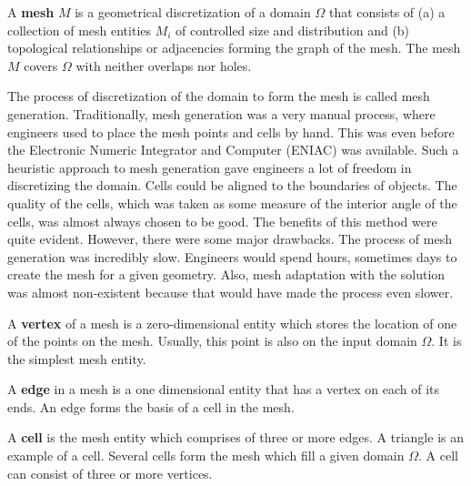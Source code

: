 \begin{definition}
	A \textbf{mesh} $M$ is a geometrical discretization of a domain $\Omega$ that consists of (a) a collection of mesh entities $M_i$ of controlled size and distribution and (b) topological relationships or adjacencies forming the graph of the mesh. The mesh $M$ covers $\Omega$ with neither overlaps nor holes.
\end{definition}

The process of discretization of the domain to form the mesh is called mesh generation. Traditionally, mesh generation was a very manual process, where engineers used to place the mesh points and cells by hand. This was even before the Electronic Numeric Integrator and Computer (ENIAC) was available. Such a heuristic approach to mesh generation gave engineers a lot of freedom in discretizing the domain. Cells could be aligned to the boundaries of objects. The quality of the cells, which was taken as some measure of the interior angle of the cells, was almost always chosen to be good. The benefits of this method were quite evident. However, there were some major drawbacks. The process of mesh generation was incredibly slow. Engineers would spend hours, sometimes days to create the mesh for a given geometry. Also, mesh adaptation with the solution was almost non-existent because that would have made the process even slower.

\begin{definition}
	A \textbf{vertex} of a mesh is a zero-dimensional entity which stores the location of one of the points on the mesh. Usually, this point is also on the input domain $\Omega$. It is the simplest mesh entity.
\end{definition}

\begin{definition}
	A \textbf{edge} in a mesh is a one dimensional entity that has a vertex on each of its ends. An edge forms the basis of a cell in the mesh.
\end{definition}

\begin{definition}
	A \textbf{cell} is the mesh entity which comprises of three or more edges. A triangle is an example of a cell. Several cells form the mesh which fill a given domain $\Omega$. A cell can consist of three or more vertices.
\end{definition}

